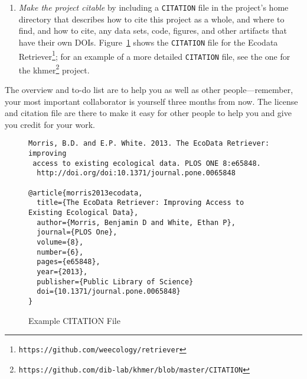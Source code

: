 \documentclass[10pt]{article}
\newcommand{\recommend}[1]{\textit{#1}}
\newcommand{\withurl}[2]{{#1}\footnote{\texttt{#2}}}
\begin{document}
\begin{enumerate}
  \begin{framed}
    \noindent \textbf{What Not To Do}

    We recommend \emph{against} the ``no commercial use'' variations
    of the Creative Commons licenses because they may impede some
    forms of re-use.  For example, if a researcher in a developing
    country is being paid by her government to compile a public health
    report, and wishes to include some of your data, she will be
    unable to do so if the license says ``non-commercial''. We
    recommend permissive software licenses rather than the
    \withurl{GNU General Public
      License}{https://www.safaribooksonline.com/library/view/understanding-open-source/0596005814/ch03.html}
    (GPL) because it is easier to integrate permissively-licensed
    software into other projects. (Note that it is straightforward to
    switch from a permissive license to the GPL if you should change
    your mind later but rather more complicated to go in the other
    direction.)
  \end{framed}

\item    
  \recommend{Make the project citable} by including a
  \texttt{CITATION} file in the project's home directory that
  describes how to cite this project as a whole, and where to find,
  and how to cite, any data sets, code, figures, and other artifacts
  that have their own DOIs.  Figure~\ref{fig:citation} shows the
  \texttt{CITATION} file for the \withurl{Ecodata
    Retriever}{https://github.com/weecology/retriever}; for an example
  of a more detailed \texttt{CITATION} file, see the one for the
  \withurl{khmer}{https://github.com/dib-lab/khmer/blob/master/CITATION}
  project.

\end{enumerate}

The overview and to-do list are to help you as well as other
people---remember, your most important collaborator is yourself three
months from now. The license and citation file are there to make it
easy for other people to help you and give you credit for your work.

\begin{figure}
\begin{verbatim}
Morris, B.D. and E.P. White. 2013. The EcoData Retriever: improving
 access to existing ecological data. PLOS ONE 8:e65848.
  http://doi.org/doi:10.1371/journal.pone.0065848

@article{morris2013ecodata,
  title={The EcoData Retriever: Improving Access to Existing Ecological Data},
  author={Morris, Benjamin D and White, Ethan P},
  journal={PLOS One},
  volume={8},
  number={6},
  pages={e65848},
  year={2013},
  publisher={Public Library of Science}
  doi={10.1371/journal.pone.0065848}
}
\end{verbatim}
\caption{Example CITATION File}
\label{fig:citation}
\end{figure}
\end{document}
